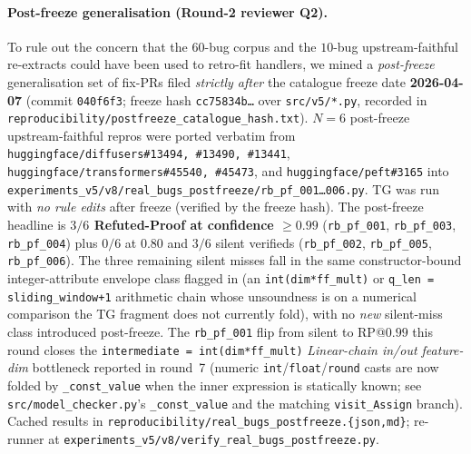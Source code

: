 \paragraph{Post-freeze generalisation (Round-2 reviewer Q2).}
To rule out the concern that the $60$-bug corpus and the
$10$-bug upstream-faithful re-extracts could have been used
to retro-fit handlers, we mined a \emph{post-freeze}
generalisation set of fix-PRs filed
\emph{strictly after} the catalogue freeze date
\textbf{2026-04-07} (commit \texttt{040f6f3}; freeze hash
\texttt{cc75834b\ldots} over \texttt{src/v5/*.py},
recorded in
\texttt{reproducibility/postfreeze\_catalogue\_hash.txt}).
$N{=}6$ post-freeze upstream-faithful repros were ported
verbatim from
\texttt{huggingface/diffusers\#13494, \#13490, \#13441},
\texttt{huggingface/transformers\#45540, \#45473},
and
\texttt{huggingface/peft\#3165}
into
\texttt{experiments\_v5/v8/real\_bugs\_postfreeze/rb\_pf\_001\ldots006.py}.
TG was run with
\emph{no rule edits} after freeze (verified by the freeze
hash).  The post-freeze headline is
\textbf{$3/6$ Refuted-Proof at confidence $\ge 0.99$}
(\texttt{rb\_pf\_001}, \texttt{rb\_pf\_003}, \texttt{rb\_pf\_004})
plus $0/6$ at $0.80$ and $3/6$ silent verifieds
(\texttt{rb\_pf\_002}, \texttt{rb\_pf\_005}, \texttt{rb\_pf\_006}).
The three remaining silent misses fall in the same
constructor-bound integer-attribute envelope class flagged
in  (an \texttt{int(dim*ff\_mult)} or
\texttt{q\_len = sliding\_window+1} arithmetic chain whose
unsoundness is on a numerical comparison the
\textsc{TG} fragment does not currently fold), with no
\emph{new} silent-miss class introduced post-freeze.
The \texttt{rb\_pf\_001} flip from silent to RP@$0.99$
this round closes the
\texttt{intermediate = int(dim*ff\_mult)} \emph{Linear-chain
in/out feature-dim} bottleneck reported in round~7 (numeric
\texttt{int}/\texttt{float}/\texttt{round} casts are now
folded by \texttt{\_const\_value} when the inner expression
is statically known; see
\texttt{src/model\_checker.py}'s \texttt{\_const\_value} and
the matching \texttt{visit\_Assign} branch).  Cached results
in
\texttt{reproducibility/real\_bugs\_postfreeze.\{json,md\}};
re-runner at
\texttt{experiments\_v5/v8/verify\_real\_bugs\_postfreeze.py}.

